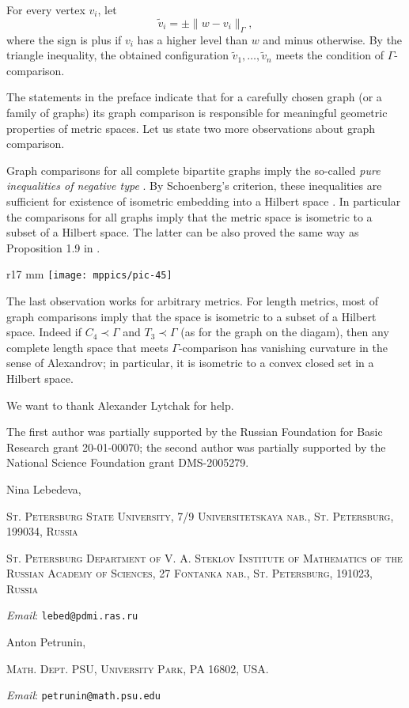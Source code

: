 \documentclass{article}
\makeatletter
\newcommand{\Addresses}{{\bigskip\footnotesize

\noindent Nina Lebedeva,
\par\nopagebreak
 \textsc{St. Petersburg State University, 7/9 Universitetskaya nab., St. Petersburg, 199034, Russia}
\par
\nopagebreak
 \textsc{St. Petersburg Department of V. A. Steklov Institute of Mathematics of the Russian Academy of Sciences, 27 Fontanka nab., St. Petersburg, 191023, Russia}
  \par\nopagebreak
  \textit{Email}: \texttt{lebed@pdmi.ras.ru}

\medskip

\noindent   Anton Petrunin, 
\par\nopagebreak
 \textsc{Math. Dept. PSU, University Park, PA 16802, USA.}
  \par\nopagebreak
  \textit{Email}: \texttt{petrunin@math.psu.edu}
  
}}
\makeatother
\begin{document}
For every vertex $v_i$, let
\[\tilde v_i=\pm \|w-v_i\|_\Gamma,\]
where the sign is plus if $v_i$ has a higher level than $w$ and minus otherwise.
By the triangle inequality, the obtained configuration $\tilde v_1,\dots,\tilde v_n$ meets the condition of $\Gamma$-comparison.
\qeds

The statements in the preface indicate that for a carefully chosen graph (or a family of graphs) its graph comparison is responsible for meaningful geometric properties of metric spaces.
Let us state two more observations about graph comparison.

Graph comparisons for all complete bipartite graphs imply the so-called \emph{pure inequalities of negative type} \cite[6.1.1]{deza-laurent}.
By Schoenberg's criterion, these inequalities are sufficient for existence of isometric embedding into a Hilbert space \cite[6.2.1]{deza-laurent}.
In particular the comparisons for all graphs imply that the metric space is isometric to a subset of a Hilbert space.
The latter can be also proved the same way as Proposition 1.9 in \cite{toyoda}.

\begin{wrapfigure}{r}{17 mm}
\vskip-6mm
\centering
\texttt{[image: mppics/pic-45]}
\vskip-2mm
\end{wrapfigure}

The last observation works for arbitrary metrics.
For length metrics, most of graph comparisons imply that the space is isometric to a subset of a Hilbert space.
Indeed if $C_4\prec\Gamma$ and $T_3\prec\Gamma$ (as for the graph on the diagam), then any complete length space that meets $\Gamma$-comparison has vanishing curvature in the sense of Alexandrov; in particular, it is isometric to a convex closed set in a Hilbert space.





We want to thank Alexander Lytchak for help. 

The first author was partially supported by the Russian Foundation for Basic Research grant 20-01-00070; the second author was partially supported by the National Science Foundation grant DMS-2005279.

{\sloppy
\printbibliography[heading=bibintoc]
\fussy
}

\Addresses
\end{document}
